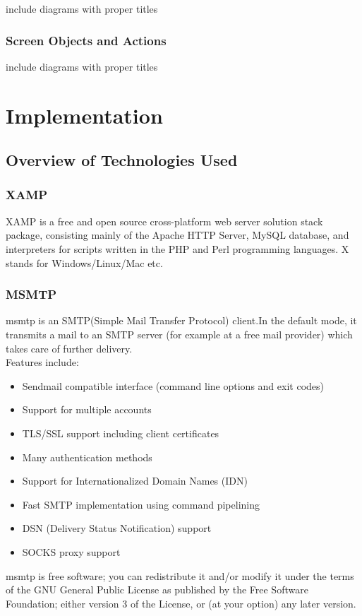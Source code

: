 \documentclass[11pt]{report}
\begin{document}
include diagrams with proper titles

\subsection{Screen Objects and Actions}

include diagrams with proper titles



\chapter{Implementation}

\section{Overview of Technologies Used}
\subsection{XAMP}
XAMP is a free and open source cross-platform web server solution stack package, consisting
mainly of the Apache HTTP Server, MySQL database, and interpreters for scripts written in the
PHP and Perl programming languages. X stands for Windows/Linux/Mac etc.

\subsection{MSMTP}
msmtp is an SMTP(Simple Mail Transfer Protocol) client.In the default mode, it transmits a mail to an SMTP server (for example at a free mail provider) which takes care of further delivery.\\Features include:
\begin{itemize}
  \item Sendmail compatible interface (command line options and exit codes)
  \item Support for multiple accounts
  \item TLS/SSL support including client certificates
  \item Many authentication methods
  \item Support for Internationalized Domain Names (IDN)
  \item Fast SMTP implementation using command pipelining
  \item DSN (Delivery Status Notification) support
  \item SOCKS proxy support
\end{itemize}
msmtp is free software; you can redistribute it and/or modify it under the terms of the GNU General Public License as published by the Free Software Foundation; either version 3 of the License, or (at your option) any later version.
\end{document}
